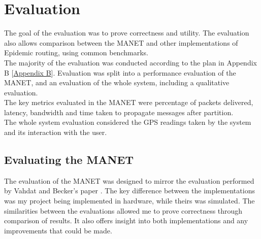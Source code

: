 \documentclass[12pt,a4paper]{report}
\newcommand{\newchapter}[2]{
    \setcounter{chapter}{#1}
    \setcounter{section}{0}
    \chapter*{#2}
    \addcontentsline{toc}{chapter}{#1 #2}
}
\begin{document}
\newchapter{4}{Evaluation}
\setcounter{figure}{0}
The goal of the evaluation was to prove correctness and utility. The evaluation also allows comparison between the MANET and other implementations of Epidemic routing, using common benchmarks. \\
The majority of the evaluation was conducted according to the plan in Appendix B [\hyperref[appendixB]{Appendix B}]. Evaluation was split into a performance evaluation of the MANET, and an evaluation of the whole system, including a qualitative evaluation. \\
The key metrics evaluated in the MANET were percentage of packets delivered, latency, bandwidth and time taken to propagate messages after partition. \\
The whole system evaluation considered the GPS readings taken by the system and its interaction with the user.\\ 

\section{Evaluating the MANET}
The evaluation of the MANET was designed to mirror the evaluation performed by Vahdat and Becker's paper \cite{epidemic}. The key difference between the implementations was my project being implemented in hardware, while theirs was simulated. The similarities between the evaluations allowed me to prove correctness through comparison of results. It also offers insight into both implementations and any improvements that could be made. \\
\end{document}
